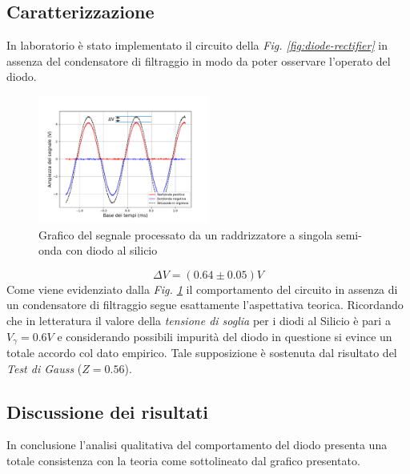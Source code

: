 \documentclass[journal]{IEEEtran}
\begin{document}
\subsection{\textbf{Caratterizzazione}}
In laboratorio è stato implementato il circuito della \textit{Fig. \ref{fig:diode-rectifier}} in assenza del condensatore di filtraggio in modo da poter osservare l'operato del diodo.
\begin{figure}[H]%
\begin {center}
\includegraphics[width=0.50\textwidth]{analysis/output/half-wave-rectifier.pdf}
\caption{Grafico del segnale processato da un raddrizzatore a singola semi-onda con diodo al silicio}
\label{fig:half-wave}
\end {center}
\end{figure}
\[\Delta V = (0.64 \pm 0.05) V\] 
Come viene evidenziato dalla \textit{Fig. \ref{fig:half-wave}} il comportamento del circuito in assenza di un condensatore di filtraggio segue esattamente l'aspettativa teorica. Ricordando che in letteratura il valore della \textit{tensione di soglia} per i diodi al Silicio è pari a $V_{\gamma}=0.6V$ e considerando possibili impurità del diodo in questione si evince un totale accordo col dato empirico. Tale supposizione è sostenuta dal risultato del \textit{Test di Gauss} ($Z = 0.56$).
\subsection{\textbf{Discussione dei risultati}}
In conclusione l'analisi qualitativa del comportamento del diodo presenta una totale consistenza con la teoria come sottolineato dal grafico presentato.


\end{document}
